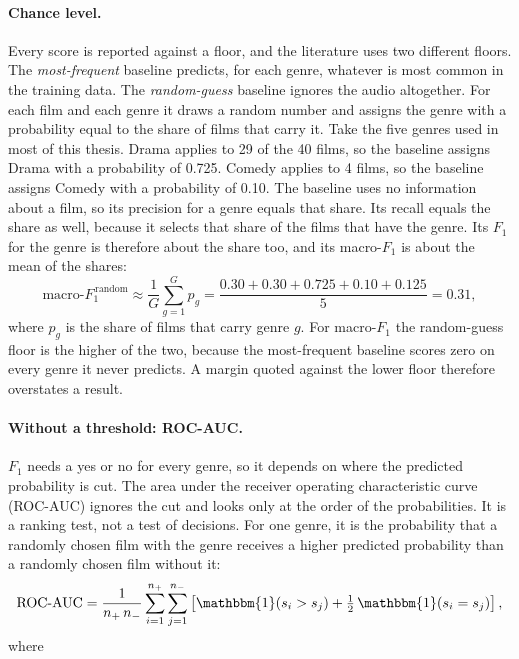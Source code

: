 \paragraph{Chance level.} Every score is reported against a floor, and the literature uses two different floors. The \emph{most-frequent} baseline predicts, for each genre, whatever is most common in the training data. The \emph{random-guess} baseline ignores the audio altogether. For each film and each genre it draws a random number and assigns the genre with a probability equal to the share of films that carry it. Take the five genres used in most of this thesis. Drama applies to 29 of the 40 films, so the baseline assigns Drama with a probability of 0.725. Comedy applies to 4 films, so the baseline assigns Comedy with a probability of 0.10. The baseline uses no information about a film, so its precision for a genre equals that share. Its recall equals the share as well, because it selects that share of the films that have the genre. Its $F_1$ for the genre is therefore about the share too, and its macro-$F_1$ is about the mean of the shares:
\begin{equation}
  \text{macro-}F_1^{\,\text{random}} \approx \frac{1}{G} \sum_{g=1}^{G} p_g = \frac{0.30 + 0.30 + 0.725 + 0.10 + 0.125}{5} = 0.31,
\end{equation}
where $p_g$ is the share of films that carry genre $g$. For macro-$F_1$ the random-guess floor is the higher of the two, because the most-frequent baseline scores zero on every genre it never predicts. A margin quoted against the lower floor therefore overstates a result.

\paragraph{Without a threshold: ROC-AUC.} $F_1$ needs a yes or no for every genre, so it depends on where the predicted probability is cut. The area under the receiver operating characteristic curve (ROC-AUC) ignores the cut and looks only at the order of the probabilities. It is a ranking test, not a test of decisions. For one genre, it is the probability that a randomly chosen film with the genre receives a higher predicted probability than a randomly chosen film without it:
\begin{equation}
  \text{ROC-AUC} = \frac{1}{n_{+}\, n_{-}} \sum_{i=1}^{n_{+}} \sum_{j=1}^{n_{-}} \left[ \mathbbm{1}(s_i > s_j) + \tfrac{1}{2}\, \mathbbm{1}(s_i = s_j) \right],
\end{equation}
where

